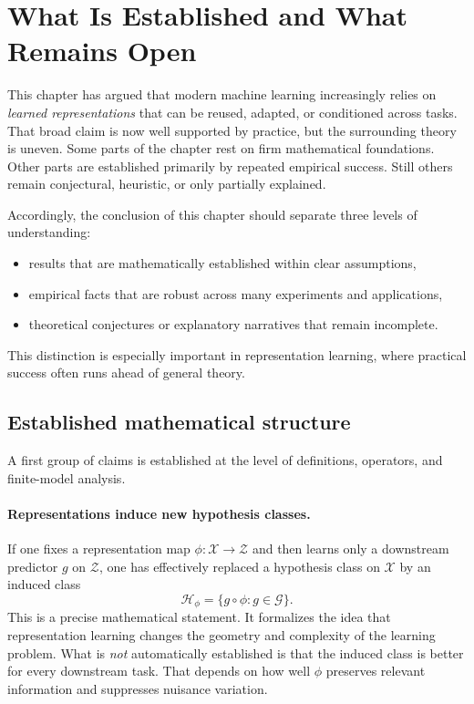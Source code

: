 \section{What Is Established and What Remains Open}

This chapter has argued that modern machine learning increasingly relies on \emph{learned representations} that can be reused, adapted, or conditioned across tasks. That broad claim is now well supported by practice, but the surrounding theory is uneven. Some parts of the chapter rest on firm mathematical foundations. Other parts are established primarily by repeated empirical success. Still others remain conjectural, heuristic, or only partially explained.

\medskip

Accordingly, the conclusion of this chapter should separate three levels of understanding:
\begin{itemize}
    \item results that are mathematically established within clear assumptions,
    \item empirical facts that are robust across many experiments and applications,
    \item theoretical conjectures or explanatory narratives that remain incomplete.
\end{itemize}

This distinction is especially important in representation learning, where practical success often runs ahead of general theory.

\subsection*{Established mathematical structure}

A first group of claims is established at the level of definitions, operators, and finite-model analysis.

\paragraph{Representations induce new hypothesis classes.}
If one fixes a representation map $\phi : \mathcal{X} \to \mathcal{Z}$ and then learns only a downstream predictor $g$ on $\mathcal{Z}$, one has effectively replaced a hypothesis class on $\mathcal{X}$ by an induced class
\[
\mathcal{H}_{\phi} = \{ g \circ \phi : g \in \mathcal{G} \}.
\]
This is a precise mathematical statement. It formalizes the idea that representation learning changes the geometry and complexity of the learning problem. What is \emph{not} automatically established is that the induced class is better for every downstream task. That depends on how well $\phi$ preserves relevant information and suppresses nuisance variation.

